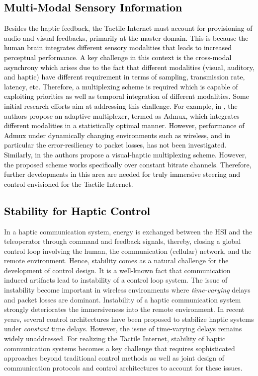 \documentclass[journal]{IEEEtran}
\begin{document}
\subsection{\textcolor{black}{Multi-Modal Sensory Information}}
\textcolor{black}{Besides the haptic feedback, the Tactile Internet must account for provisioning of audio and visual feedbacks, primarily at the master domain. This is because the human brain integrates different sensory modalities \cite{vh-integ} that leads to increased perceptual performance. A key challenge in this context is the cross-modal asynchrony which arises due to the fact that different modalities (visual, auditory, and haptic) have different requirement in terms of sampling, transmission rate, latency, etc. Therefore, a multiplexing scheme is required which is capable of exploiting priorities as well as temporal integration of different modalities. Some initial research efforts aim at addressing this challenge. For example, in \cite{admux}, the authors propose an adaptive multiplexer, termed as Admux, which integrates different modalities in a statistically optimal manner. However, performance of Admux under dynamically changing environments such as wireless, and in particular the error-resiliency to packet losses, has not been investigated. Similarly, in \cite{vh-mux} the authors propose a visual-haptic multiplexing scheme. However, the proposed scheme works specifically over constant bitrate channels. Therefore, further developments in this area are needed for truly immersive steering and control envisioned for the Tactile Internet.}











\subsection{\textcolor{black}{Stability for Haptic Control}}
In a haptic communication system, energy is exchanged between the HSI and the teleoperator through command and feedback signals, thereby, closing a global control loop involving the human, the communication (cellular) network, and the remote environment. Hence, stability comes as a natural challenge for the development of control design. It is a well-known fact that communication induced artifacts lead to instability of a control loop system. The issue of instability become important in wireless environments where \emph{time-varying} delays and packet losses are dominant. Instability of a haptic communication system strongly deteriorates the immersiveness into the remote environment. In recent years, several control architectures have been proposed to stabilize haptic systems under \emph{constant} time delays. However, the issue of time-varying delays remains widely unaddressed. For realizing the Tactile Internet, stability of haptic communication systems becomes a key challenge that requires sophisticated approaches beyond traditional control methods as well as joint design of communication protocols and control architectures to account for these issues.
\end{document}
